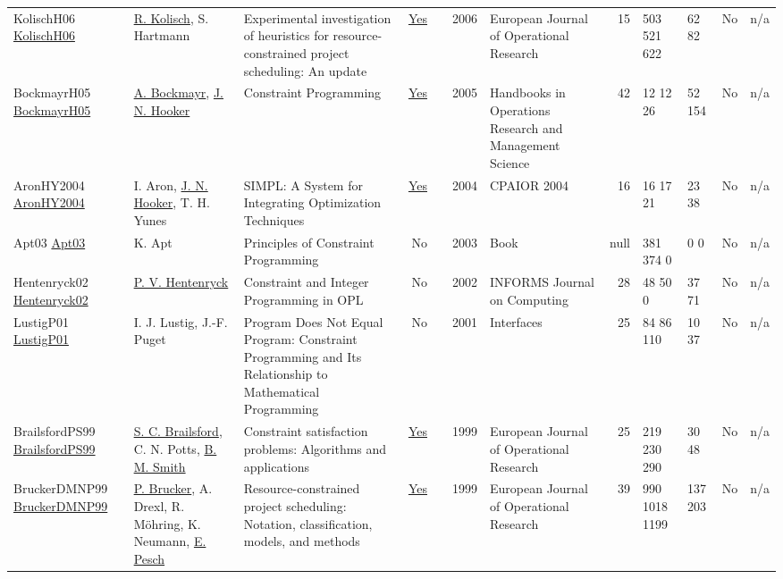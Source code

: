 {\begin{longtable}{>{\raggedright\arraybackslash}p{3cm}>{\raggedright\arraybackslash}p{4.5cm}>{\raggedright\arraybackslash}p{6.0cm}rrrp{2.5cm}rp{1cm}p{1cm}rr}
KolischH06 \href{http://dx.doi.org/10.1016/j.ejor.2005.01.065}{KolischH06} & \hyperref[auth:a440]{R. Kolisch}, S. Hartmann & Experimental investigation of heuristics for resource-constrained project scheduling: An update & \href{../works/KolischH06.pdf}{Yes} & \cite{KolischH06} & 2006 & European Journal of Operational Research & 15 & 503 521 622 & 62 82 & No & n/a\\
BockmayrH05 \href{http://dx.doi.org/10.1016/s0927-0507(05)12010-6}{BockmayrH05} & \hyperref[auth:a908]{A. Bockmayr}, \hyperref[auth:a160]{J. N. Hooker} & Constraint Programming & \href{../works/BockmayrH05.pdf}{Yes} & \cite{BockmayrH05} & 2005 & Handbooks in Operations Research and Management Science & 42 & 12 12 26 & 52 154 & No & n/a\\
AronHY2004 \href{http://dx.doi.org/10.1007/978-3-540-24664-0_2}{AronHY2004} & I. Aron, \hyperref[auth:a160]{J. N. Hooker}, T. H. Yunes & SIMPL: A System for Integrating Optimization Techniques & \href{../works/AronHY2004.pdf}{Yes} & \cite{AronHY2004} & 2004 & CPAIOR 2004 & 16 & 16 17 21 & 23 38 & No & n/a\\
Apt03 \href{http://dx.doi.org/10.1017/cbo9780511615320}{Apt03} & K. Apt & Principles of Constraint Programming & No & \cite{Apt03} & 2003 & Book & null & 381 374 0 & 0 0 & No & n/a\\
Hentenryck02 \href{http://dx.doi.org/10.1287/ijoc.14.4.345.2826}{Hentenryck02} & \hyperref[auth:a148]{P. V. Hentenryck} & Constraint and Integer Programming in OPL & No & \cite{Hentenryck02} & 2002 & \cellcolor{red!20}INFORMS Journal on Computing & 28 & 48 50 0 & 37 71 & No & n/a\\
LustigP01 \href{http://dx.doi.org/10.1287/inte.31.6.29.9647}{LustigP01} & I. J. Lustig, J.-F. Puget & Program Does Not Equal Program: Constraint Programming and Its Relationship to Mathematical Programming & No & \cite{LustigP01} & 2001 & \cellcolor{red!20}Interfaces & 25 & 84 86 110 & 10 37 & No & n/a\\
BrailsfordPS99 \href{http://dx.doi.org/10.1016/s0377-2217(98)00364-6}{BrailsfordPS99} & \hyperref[auth:a1052]{S. C. Brailsford}, C. N. Potts, \hyperref[auth:a1054]{B. M. Smith} & Constraint satisfaction problems: Algorithms and applications & \href{../works/BrailsfordPS99.pdf}{Yes} & \cite{BrailsfordPS99} & 1999 & European Journal of Operational Research & 25 & 219 230 290 & 30 48 & No & n/a\\
BruckerDMNP99 \href{http://dx.doi.org/10.1016/s0377-2217(98)00204-5}{BruckerDMNP99} & \hyperref[auth:a847]{P. Brucker}, A. Drexl, R. M\"{o}hring, K. Neumann, \hyperref[auth:a438]{E. Pesch} & Resource-constrained project scheduling: Notation, classification, models, and methods & \href{../works/BruckerDMNP99.pdf}{Yes} & \cite{BruckerDMNP99} & 1999 & European Journal of Operational Research & 39 & 990 1018 1199 & 137 203 & No & n/a\\

\end{longtable}}
